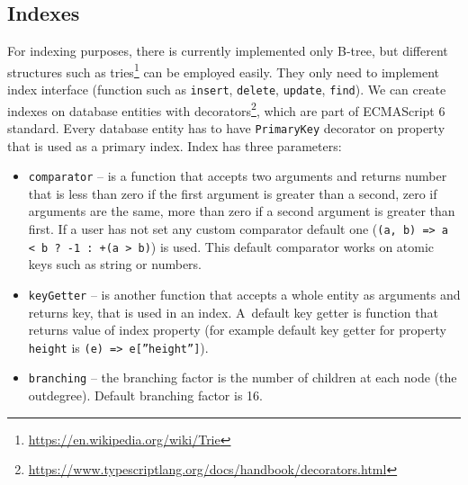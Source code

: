 \subsection{Indexes}
For indexing purposes, there is currently implemented only B-tree, but different structures such as tries\footnote{\url{https://en.wikipedia.org/wiki/Trie}} can be employed easily. They only need to implement index interface (function such as \texttt{insert}, \texttt{delete}, \texttt{update}, \texttt{find}). We can create indexes on database entities with decorators\footnote{\url{https://www.typescriptlang.org/docs/handbook/decorators.html}}, which are part of ECMAScript 6 standard. Every database entity has to have \texttt{PrimaryKey} decorator on property that is used as a primary index. Index has three parameters:
\begin{itemize}
    \item \texttt{comparator} -- is a function that accepts two arguments and returns number that is less than zero if the first argument is greater than a second, zero if arguments are the same, more than zero if a second argument is greater than first. If a user has not set any custom comparator default one (\texttt{(a, b) =>
    a < b ? -1 : +(a > b)}) is used. This default comparator works on atomic keys such as string or numbers. 
    \item \texttt{keyGetter} -- is another function that accepts a whole entity as arguments and returns key, that is used in an index. A~default key getter is function that returns value of index property (for example default key getter for property \texttt{height} is \texttt{(e) =>  e[''height'']}).
    \item \texttt{branching} -- the branching factor is the number of children at each node (the outdegree). Default branching factor is 16.
\end{itemize}

